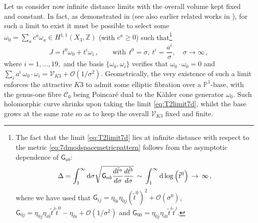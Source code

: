 Let us consider now infinite distance limits with the overall volume kept fixed and constant. In fact, as demonstrated in \cite{Lee:2019xtm} (see also earlier related works in \cite{Lee:2018urn,Lee:2018spm}), for such a limit to exist it must be possible to select some $\omega_0 =\sum_a c^a \omega_a \in H^{1,1}(X_3,\mathbb{Z})$ (with $c^a \geq 0$) such that\footnote{The fact that the limit \eqref{eq:T2limit7d} lies at infinite distance with respect to the metric \eqref{eq:7dmodspacemetricpattern} follows from the asymptotic dependence of $\mathsf{G}_{a b}$:
\begin{equation}
	\notag \Delta= \int_1^{\infty} {\rm d} \sigma \sqrt{\mathsf{G}_{a b} \frac{d \tilde{t}^a}{d \sigma} \frac{d \tilde{t}^b}{d \sigma}}\, \sim\, \int_1^{\infty} {\rm d} \log \left(\tilde{t}^0 \right)\, \to\, \infty\, ,
\end{equation}
where we have used that $\mathsf{G}_{i j}=\eta_{0i} \eta_{0j} \left( \tilde{t}^0\right)^2 + \mathcal{O} (\sigma^0)$, $\mathsf{G}_{0 j}=\eta_{0j} \eta_{i 0} \tilde{t}^j \tilde{t}^0 - \eta_{0i} + \mathcal{O} (1/\sigma^2)$ and $\mathsf{G}_{0 0}= \eta_{0j} \eta_{i 0} \tilde{t}^i \tilde{t}^j$.}
%
\begin{equation}\label{eq:T2limit7d}
	J= t^0 \omega_0 + t^i \omega_i %
	\, , \qquad \text{with}\ \ t^0 = \sigma,\ t^i = \frac{a^i}{\sigma}, \quad \sigma \to \infty\, ,
\end{equation}
%
where $i=1, \ldots, 19,$ and the basis $\lbrace \omega_0, \omega_i\rbrace$ verifies that $\omega_0 \cdot \omega_0=0$ and $\sum_i a^i\, \omega_0 \cdot \omega_i= \mathcal{V}_{K3} + \mathcal{O}(1/\sigma^2)$. Geometrically, the very existence of such a limit enforces the attractive $K3$ to admit some elliptic fibration over a $\mathbb{P}^1$-base, with the genus-one fibre $\mathcal{C}_0$ being Poincaré dual to the K\"ahler cone generator $\omega_0$. Such holomorphic curve shrinks upon taking the limit \eqref{eq:T2limit7d}, whilst the base grows at the same rate so as to keep the overall $\mathcal{V}_{K3}$ fixed and finite.
	
